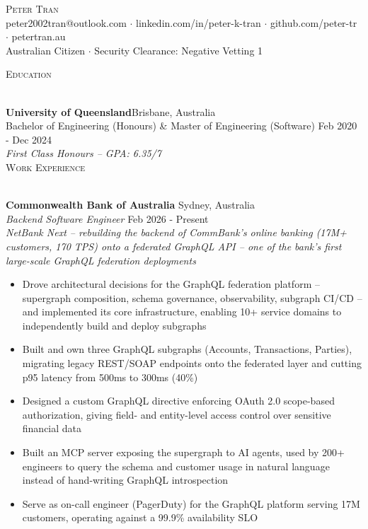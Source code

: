 \documentclass[a4paper]{article}
\newcommand{\lineunder}{
    \vspace*{-8pt} \\
    \hspace*{-18pt} \hrulefill \\
    \vspace*{-4pt}
}
\newcommand{\header}[1]{
    {\hspace*{-18pt}\vspace*{3pt} \textsc{#1}}
    \vspace*{-3pt} \lineunder
}
\begin{document}
\vspace*{-18pt}

\begin{center}
    {\Huge \scshape {Peter Tran}}\\
    peter2002tran@outlook.com $\cdot$ linkedin.com/in/peter-k-tran $\cdot$ github.com/peter-tr $\cdot$ petertran.au\\
    {\small Australian Citizen $\cdot$ Security Clearance: Negative Vetting 1}
\end{center}

\header{Education}
\vspace{1.5mm}
\textbf{University of Queensland}\hfill Brisbane, Australia\\
Bachelor of Engineering (Honours) \& Master of Engineering (Software) \hfill Feb 2020 - Dec 2024\\
\textit{First Class Honours -- GPA: 6.35/7}\\

\header{Work Experience}
\vspace{1.5mm}
\textbf{Commonwealth Bank of Australia} \hfill Sydney, Australia\\
\textit{Backend Software Engineer} \hfill Feb 2026 - Present\\
{\small \textit{NetBank Next -- rebuilding the backend of CommBank's online banking (17M+ customers, 170 TPS) onto a federated GraphQL API -- one of the bank's first large-scale GraphQL federation deployments}}\\
\vspace{-2mm}
\begin{itemize} \itemsep -1pt
    \item Drove architectural decisions for the GraphQL federation platform -- supergraph composition, schema governance, observability, subgraph CI/CD -- and implemented its core infrastructure, enabling 10+ service domains to independently build and deploy subgraphs
    \item Built and own three GraphQL subgraphs (Accounts, Transactions, Parties), migrating legacy REST/SOAP endpoints onto the federated layer and cutting p95 latency from 500ms to 300ms (40\%)
    \item Designed a custom GraphQL directive enforcing OAuth 2.0 scope-based authorization, giving field- and entity-level access control over sensitive financial data
    \item Built an MCP server exposing the supergraph to AI agents, used by 200+ engineers to query the schema and customer usage in natural language instead of hand-writing GraphQL introspection
    \item Serve as on-call engineer (PagerDuty) for the GraphQL platform serving 17M customers, operating against a 99.9\% availability SLO
\end{itemize}
\end{document}
